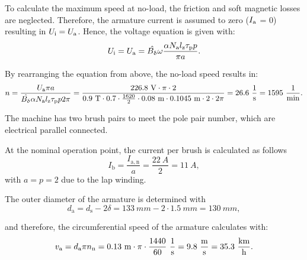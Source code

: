 \begin{solutionblock}
	To calculate the maximum speed at no-load, the friction and soft magnetic losses are neglected. Therefore, the armature current is assumed to zero ($I_{\mathrm{a}}$ = 0) resulting in $U_{\mathrm{i}} = U_{\mathrm{a}}$.
	Hence, the voltage equation is given with:
	\begin{equation}
		U_{\mathrm{i}} = U_{\mathrm{a}} = \hat{B_{\updelta}} \omega \frac{\alpha N_{\mathrm{a}} l_{\mathrm{z}} \tau_{\mathrm{p}} p}{\pi a}.
	\end{equation}

	By rearranging the equation from above, the no-load speed results in:
	\begin{equation}
		n = \frac{\Ua \pi a}{\hat{B_{\updelta}} \alpha N_{\mathrm{a}} \lz \taup p 2\pi}
		= \frac{226.8 \ \si{V} \cdot \pi \cdot 2}{0.9 \ \si{T} \cdot 0.7 \cdot \frac{1620}{2} \cdot 0.08 \ \si{m} \cdot 0.1045 \ \si{m} \cdot 2 \cdot 2\pi}
		= 26.6 \ \si{\frac{1}{s}} = 1595 \ \si{\frac{1}{min}}.
	\end{equation}

\end{solutionblock}


\begin{solutionblock}
	The machine has two brush pairs to meet the pole pair number, which are electrical parallel connected.

	At the nominal operation point, the current per brush is calculated as follows
	\begin{equation}
		I_{\mathrm{b}} = \frac{I_{\mathrm{a,n}}}{a}
		= \frac{22 \ \si{A}}{2}
		= 11 \ \si{A},
	\end{equation}
	with $a = p = 2$ due to the lap winding.

	The outer diameter of the armature is determined with
	\begin{equation}
		d_{\mathrm{a}} = d_{\mathrm{s}} - 2 \delta
		= 133 \ \si{mm} - 2 \cdot 1.5 \ \si{mm}
		= 130 \ \si{mm},
	\end{equation}

	and therefore, the circumferential speed of the armature calculates with:
	\begin{equation}
		v_{\mathrm{a}} = d_{\mathrm{a}} \pi \nN
		= 0.13 \ \si{m} \cdot \pi \cdot \frac{1440}{60} \ \si{\frac{1}{s}}
		= 9.8 \ \si{\frac{m}{s}}
		= 35.3 \ \si{\frac{km}{h}}.
	\end{equation}

\end{solutionblock}


